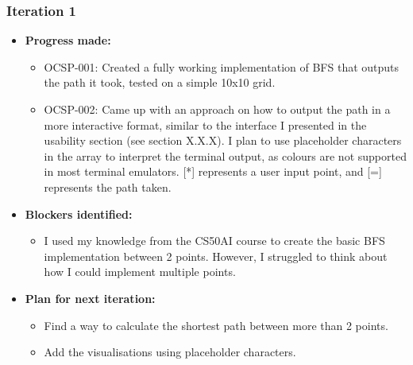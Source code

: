 \subsubsection{Iteration 1}
\begin{itemize}
    \item \textbf{Progress made:}
    \begin{itemize}
        \item OCSP-001: Created a fully working implementation of BFS that outputs the path it took, tested on a simple 10x10 grid.
        \item OCSP-002: Came up with an approach on how to output the path in a more interactive format, similar to the interface I presented in the usability section (see section X.X.X). I plan to use placeholder characters in the array to interpret the terminal output, as colours are not supported in most terminal emulators. [*] represents a user input point, and [=] represents the path taken.
    \end{itemize}
    \item \textbf{Blockers identified:}
    \begin{itemize}
        \item I used my knowledge from the CS50AI course to create the basic BFS implementation between 2 points. However, I struggled to think about how I could implement multiple points.

    \end{itemize}
    \item \textbf{Plan for next iteration:}
    \begin{itemize}
        \item Find a way to calculate the shortest path between more than 2 points.
        \item Add the visualisations using placeholder characters.
    \end{itemize}
\end{itemize}

